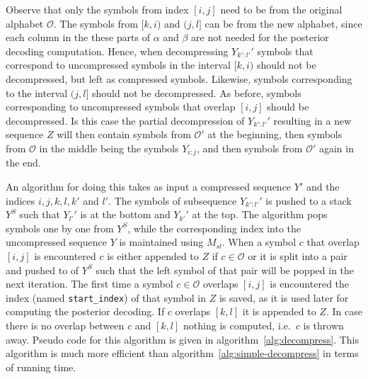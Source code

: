 Observe that only the symbols from index $[i,j]$ need to be from the original
alphabet $\mathcal{O}$. The symbols from $[k, i)$ and $(j, l]$ can be from the
new alphabet, since each column in the these parts of $\alpha$ and $\beta$ are
not needed for the posterior decoding computation. Hence, when decompressing
$Y_{k':l'}'$ symbols that correspond to uncompressed symbols in the interval
$[k, i)$ should not be decompressed, but left as compressed symbols. Likewise,
symbols corresponding to the interval $(j, l]$ should not be decompressed. As
before, symbols corresponding to uncompressed symbols that overlap $[i, j]$
should be decompressed. Is this case the partial decompression of
$Y_{k':l'}'$ resulting in a new sequence $Z$ will then contain symbols
from $\mathcal{O'}$ at the beginning, then symbols from $\mathcal{O}$ in
the middle being the symbols $Y_{i:j}$, and then  symbols from
$\mathcal{O'}$ again in the end.

An algorithm for doing this takes as input a compressed sequence $Y'$ and the
indices $i, j, k, l, k'$ and $l'$. The symbols of subsequence $Y_{k':l'}'$ is
pushed to a stack $Y^S$ such that $Y_{l'}'$ is at the bottom and $Y_{k'}'$ at
the top. The algorithm pops symbols one by one from $Y^S$, while the
corresponding index into the uncompressed sequence $Y$ is maintained using
$M_{sl}$. When a symbol $c$ that overlap $[i, j]$ is encountered $c$ is either
appended to $Z$ if $c \in \mathcal{O}$ or it is split into a pair and pushed to
of $Y^S$ such that the left symbol of that pair will be popped in the next
iteration. The first time a symbol $c \in \mathcal{O}$ overlaps $[i, j]$ is
encountered the index (named \texttt{start\_index}) of that symbol in $Z$ is
saved, as it is used later for computing the posterior decoding. If $c$
overlaps $[k, l]$ it is appended to $Z$. In case there is no overlap between
$c$ and $[k, l]$ nothing is computed, i.e.\ $c$ is thrown away. Pseudo code for
this algorithm is given in algorithm~\ref{alg:decompress}. This algorithm is
much more efficient than algorithm~\ref{alg:simple-decompress} in terms of running
time.

